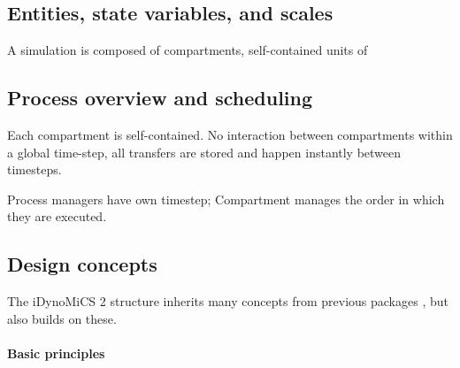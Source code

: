 \documentclass[10pt,letterpaper]{article}
\begin{document}
\subsection*{Entities, state variables, and scales}
A simulation is composed of compartments, self-contained units of 

\subsection*{Process overview and scheduling}
Each compartment is self-contained.
No interaction between compartments within a global time-step, all transfers are stored and happen instantly between timesteps.

Process managers have own timestep; Compartment manages the order in which they are executed.

\subsection*{Design concepts}
The iDynoMiCS 2 structure inherits many concepts from previous packages \cite{Kreft1998, Lardon2011}, but also builds on these.

\paragraph{Basic principles}
\end{document}
